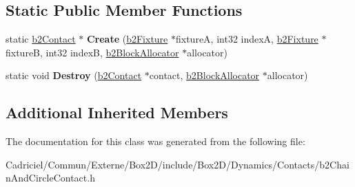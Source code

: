 \subsection*{Static Public Member Functions}
\begin{DoxyCompactItemize}
\item 
static \hyperlink{classb2_contact}{b2\+Contact} $\ast$ {\bfseries Create} (\hyperlink{classb2_fixture}{b2\+Fixture} $\ast$fixtureA, int32 indexA, \hyperlink{classb2_fixture}{b2\+Fixture} $\ast$fixtureB, int32 indexB, \hyperlink{classb2_block_allocator}{b2\+Block\+Allocator} $\ast$allocator)\hypertarget{classb2_chain_and_circle_contact_a644e6d00b903534b5b00e76c52859ad8}{}\label{classb2_chain_and_circle_contact_a644e6d00b903534b5b00e76c52859ad8}

\item 
static void {\bfseries Destroy} (\hyperlink{classb2_contact}{b2\+Contact} $\ast$contact, \hyperlink{classb2_block_allocator}{b2\+Block\+Allocator} $\ast$allocator)\hypertarget{classb2_chain_and_circle_contact_abe4320581520cd75b333200745f436b8}{}\label{classb2_chain_and_circle_contact_abe4320581520cd75b333200745f436b8}

\end{DoxyCompactItemize}
\subsection*{Additional Inherited Members}


The documentation for this class was generated from the following file\+:\begin{DoxyCompactItemize}
\item 
Cadriciel/\+Commun/\+Externe/\+Box2\+D/include/\+Box2\+D/\+Dynamics/\+Contacts/b2\+Chain\+And\+Circle\+Contact.\+h\end{DoxyCompactItemize}
